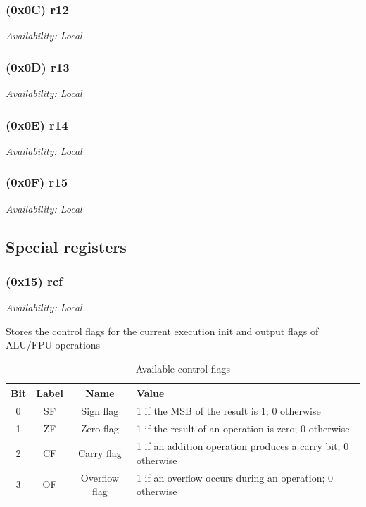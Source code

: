 \documentclass[a4paper,10pt]{article}
\begin{document}
\subsubsection{(0x0C) r12}
{\small \textit{Availability: Local}}

\subsubsection{(0x0D) r13}
{\small \textit{Availability: Local}}

\subsubsection{(0x0E) r14}
{\small \textit{Availability: Local}}

\subsubsection{(0x0F) r15}
{\small \textit{Availability: Local}}

\subsection{Special registers}
\subsubsection{(0x15) rcf} \label{r:rcf}
{\small \textit{Availability: Local}}

Stores the control flags for the current execution init and output flags of ALU/FPU operations

\begin{table}[H]
	\centering
	\caption{Available control flags}
	\resizebox{\linewidth}{!}
	{
		\begin{tabular}{|c|c|c|l|}
\hline
Bit & Label & Name & Value \\
\hline
0 & SF & Sign flag & 1 if the MSB of the result is 1; 0 otherwise \\
\hline
1 & ZF & Zero flag & 1 if the result of an operation is zero; 0 otherwise \\
\hline
2 & CF & Carry flag & 1 if an addition operation produces a carry bit; 0 otherwise \\
\hline
3 & OF & Overflow flag & 1 if an overflow occurs during an operation; 0 otherwise \\
\hline
		\end{tabular}
	}
\end{table}
\end{document}
